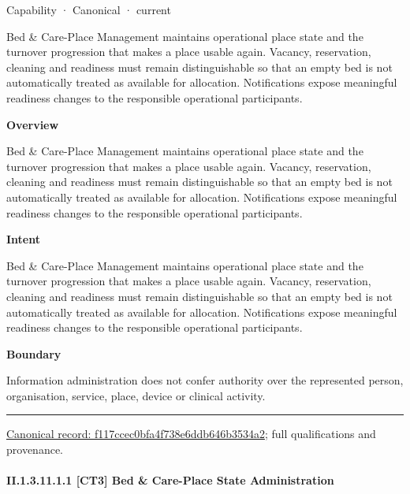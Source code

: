\label{element:f117ccec0bfa4f738e6ddb646b3534a2}
{\small Capability · Canonical · current}\par

Bed \& Care-Place Management maintains operational place state and the turnover progression that makes a place usable again. Vacancy, reservation, cleaning and readiness must remain distinguishable so that an empty bed is not automatically treated as available for allocation. Notifications expose meaningful readiness changes to the responsible operational participants.



\textbf{Overview}



Bed \& Care-Place Management maintains operational place state and the turnover progression that makes a place usable again. Vacancy, reservation, cleaning and readiness must remain distinguishable so that an empty bed is not automatically treated as available for allocation. Notifications expose meaningful readiness changes to the responsible operational participants.



\textbf{Intent}



Bed \& Care-Place Management maintains operational place state and the turnover progression that makes a place usable again. Vacancy, reservation, cleaning and readiness must remain distinguishable so that an empty bed is not automatically treated as available for allocation. Notifications expose meaningful readiness changes to the responsible operational participants.



\textbf{Boundary}



Information administration does not confer authority over the represented person, organisation, service, place, device or clinical activity.



\medskip\hrule\medskip

{\footnotesize \href{../../../../continuum/strategy/capability/f117ccec0bfa4f738e6ddb646b3534a2.md}{Canonical record: f117ccec0bfa4f738e6ddb646b3534a2}; full qualifications and provenance.}\par
\paragraph*{II.1.3.11.1.1 [CT3] Bed \& Care-Place State Administration}
\label{navigation:II.1.3.11.1.1}

